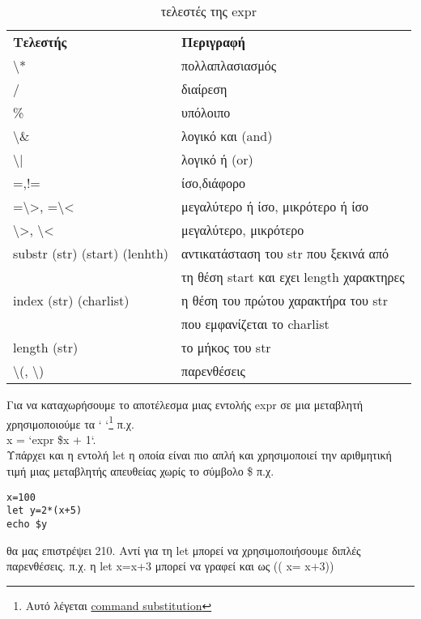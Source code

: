 \begin{center}
	\begin{table}[h]
		\small
		\begin{tabularx}{\columnwidth}{l|X}
			\rowcolor[gray]{0.9}
			\textbf{Τελεστής} & \textbf{Περιγραφή} \\
			{\textbackslash}*	&	πολλαπλασιασμός	 \\
			/ 			&	διαίρεση	 \\
			\%			&	υπόλοιπο	 \\
			{\textbackslash}\&	&	λογικό και (and) \\
			{\textbackslash}|	&	λογικό ή (or) \\
			=,!=			&	ίσο,διάφορο	 \\
			={\textbackslash}>, ={\textbackslash}< 		&	μεγαλύτερο ή ίσο, μικρότερο ή ίσο \\
			{\textbackslash}>, {\textbackslash}< 		&	μεγαλύτερο, μικρότερο \\
			substr (str) (start) (lenhth) 	&	αντικατάσταση του str που ξεκινά από\\  
			& τη θέση start και εχει length χαρακτηρες  \\
			index (str) (charlist) 		&	η θέση του πρώτου χαρακτήρα του str \\
			&	που εμφανίζεται το charlist \\
			length (str)			&	το μήκος του str \\
			{\textbackslash}(, {\textbackslash}) 	&	παρενθέσεις	 \\											
		\end{tabularx}  
	\caption{τελεστές της expr} 
	\label{tab:operators}            
	\end{table}
\end{center}



Για να καταχωρήσουμε το αποτέλεσμα μιας εντολής expr σε μια μεταβλητή χρησιμοποιούμε τα ` `\footnote{Αυτό λέγεται \href{http://www.dartmouth.edu/~rc/classes/ksh/command-subs.html\#top}{command substitution}} π.χ. \\
x = `expr \$x + 1`.\\
Υπάρχει και η εντολή let η οποία είναι πιο απλή και χρησιμοποιεί την αριθμητική τιμή μιας μεταβλητής απευθείας χωρίς το σύμβολο \$ π.χ.

\begin{lstlisting}
x=100 
let y=2*(x+5) 
echo $y 
\end{lstlisting}

θα μας επιστρέψει 210. Αντί για τη let μπορεί να χρησιμοποιήσουμε διπλές παρενθέσεις. π.χ. η let x=x+3 μπορεί να γραφεί και ως (( x= x+3))

